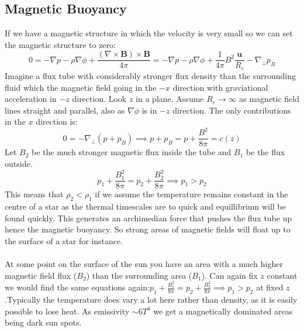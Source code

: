 \documentclass{article}
\begin{document}
\subsection{Magnetic Buoyancy}
If we have a magnetic structure in which the velocity is very small so we can set the magnetic structure to zero:
$$
0 = - \nabla p - \rho \nabla \phi + \frac{(\nabla \times \bm B) \times \bm B}{4 \pi} = -\nabla p - \rho \nabla \phi + \frac{1}{4\pi} B^2 \frac{\bm u}{R_c} - \nabla_{\perp}p_B
$$
Imagine a flux tube with considerably stronger flux density than the surrounding fluid which the magnetic field going in the $-x$ direction with graviational acceleration in $-z$ direction. Look $z$ in a plane. Assume $R_c \rightarrow \infty$ as magnetic field lines straight and parallel, also as $\nabla \phi$ is in $-z$ direction. The only contributions in the $x$ direction is: 
$$
0 = - \nabla_{\perp} (p+p_B) \implies p+p_B = p + \frac{B^2}{8\pi}= c(z)
$$
Let $B_2$ be the much stronger magnetic flux inside the tube and $B_1$ be the flux outside.
$$
 p_1 + \frac{B_1^2}{8\pi} =  p_2 + \frac{B_2^2}{8\pi} \implies p_1 > p_2
 $$
 This means that $\rho_2 < \rho_1$ if we assume the temperature remains constant in the centre of a star as the thermal timescales are to quick and equillibrium will be found quickly. This generates an archimedian force that pushes the flux tube up hence the magnetic buoyancy. So strong areas of magnetic fields will float up to the surface of a star for instance. \\
\\
At some point on the surface of the sun you have an area with a much higher magnetic field flux ($B_2$) than the surrounding area ($B_1$). Can again fix $z$ constant we would find the same equations again:$p_1 + \frac{B_1^2}{8\pi} =  p_2 + \frac{B_2^2}{8\pi} \implies p_1 > p_2$ at fixed $z$.Typically the temperature does vary a lot here rather than density, as it is easily possible to lose heat. As emissivity $\sim 6T^4$ we get a magnetically dominated areas being dark sun spots.
\end{document}
